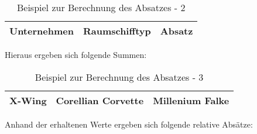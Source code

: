 \begin{table}[ht]
     \centering
     \begin{tabular}{ | l | l | l | }
          \hline
          Unternehmen & Raumschifftyp & Absatz \\
          \hline \hline
     \end{tabular}
     \caption{Beispiel zur Berechnung des Absatzes - 2}
     \label{tab:spielwelt-logik-absatzmengen-beispiel2}
\end{table}
 
 Hieraus ergeben sich folgende Summen:
 
\begin{table}[ht]
     \centering
     \begin{tabular}{ | l | l | l | }
          \hline
          X-Wing & Corellian Corvette & Millenium Falke \\
          \hline \hline
          
     \end{tabular}
     \caption{Beispiel zur Berechnung des Absatzes - 3}
     \label{tab:spielwelt-logik-absatzmengen-beispiel3}
\end{table} 

Anhand der erhaltenen Werte ergeben sich folgende relative Absätze:

